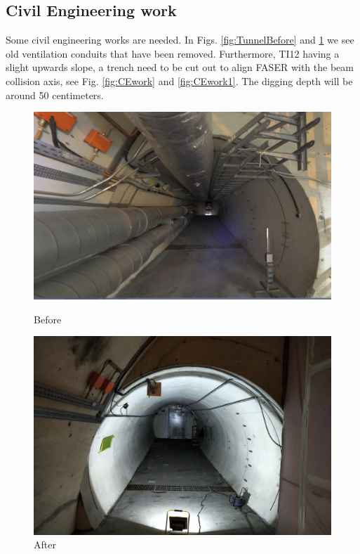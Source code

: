 \subsection{Civil Engineering work}

Some civil engineering works are needed. In Figs. \ref{fig:TunnelBefore} and \ref{fig:TunnelAfter} we see old ventilation conduits that have been removed. Furthermore, TI12 having a slight upwards slope, a trench need to be cut out to align FASER with the beam collision axis, see Fig. \ref{fig:CEwork} and \ref{fig:CEwork1}. The digging depth will be around 50 centimeters.

\begin{figure}[htbp!] 
\centering
\begin{minipage}{.5\textwidth}
  \centering
  \includegraphics[width=.9\linewidth]{TunnelBefore}
  \caption[Tunnel Before]{Before}
  \label{fig:TunnelBefore}
\end{minipage}%
\begin{minipage}{.5\textwidth}
  \centering
  \includegraphics[width=.85\linewidth]{TunnelAfter}
  \caption[Tunnel After]{After}
  \label{fig:TunnelAfter}
\end{minipage}
\end{figure}

